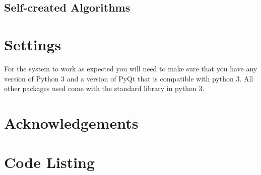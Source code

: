 \subsection{Self-created Algorithms}

\section{Settings}
For the system to work as expected you will need to make sure that you have any version of Python 3 and a version of PyQt that is compatible with python 3. All other packages used come with the standard library in python 3.
\section{Acknowledgements}

\section{Code Listing}

